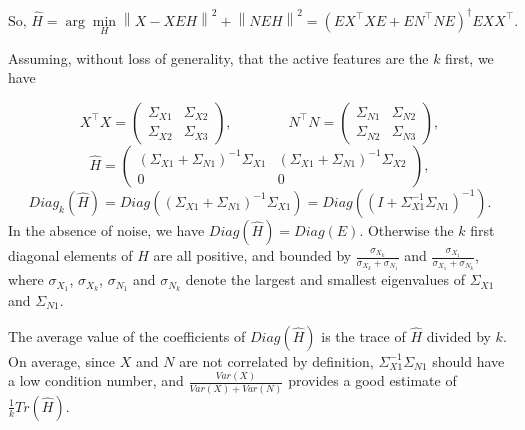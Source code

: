 \documentclass{article}
\begin{document}
%
\begin{equation}
  \text{So, }\hat H = \arg \min_H  \left \| X - XEH\right\| ^2  + \left \| NEH\right \| ^2 = (E X^\top XE +EN^\top NE) ^\dagger EXX^\top.
\end{equation}

Assuming, without loss of generality, that the active features are the $k$ first, we have

\begin{equation}
  X^\top X = \left(\begin{array}{lccl}\Sigma_{X1} & \Sigma_{X2} \\ \Sigma_{X2} & \Sigma_{X3}\end{array}\right),\qquad\qquad N^\top N = \left(\begin{array}{lccl}\Sigma_{N1} & \Sigma_{N2} \\ \Sigma_{N2} & \Sigma_{N3}\end{array}\right),
\end{equation}
\begin{equation}
  \hat H = \left(\begin{array}{cc}(\Sigma_{X1}+\Sigma_{N1})^{-1}\Sigma_{X1} & (\Sigma_{X1}+\Sigma_{N1})^{-1}\Sigma_{X2} \\0 & 0\end{array}\right),
\end{equation}
\begin{equation}
  Diag_k (\hat H) = Diag((\Sigma_{X1}+\Sigma_{N1})^{-1}\Sigma_{X1}) = Diag((I+\Sigma_{X1}^{-1}\Sigma_{N1})^{-1}).
\end{equation}
%
%
In the absence of noise, we have $Diag(\hat H) = Diag(E)$. Otherwise the $k$ first diagonal elements of $\hat H$ are all positive, and bounded by $\frac{\sigma_{X_k}}{\sigma_{X_k} +\sigma_{N_1}}$ and $\frac{\sigma_{X_1}}{\sigma_{X_1} +\sigma_{N_k}}$, where  $\sigma_{X_1}$, $\sigma_{X_k}$, $\sigma_{N_1}$ and $\sigma_{N_k}$ denote the largest and smallest eigenvalues of $\Sigma_{X1}$ and $\Sigma_{N1}$.

The average value of the coefficients of $Diag(\hat H)$ is the trace of $\hat H$ divided by $k$. On average, since $X$ and $N$ are not correlated by definition, $\Sigma_{X1}^{-1}\Sigma_{N1}$ should have a low condition number, and $\frac{Var(X)}{Var(X)+Var(N)}$ provides a good estimate of $\frac{1}{k}Tr(\hat H)$.
\end{document}

